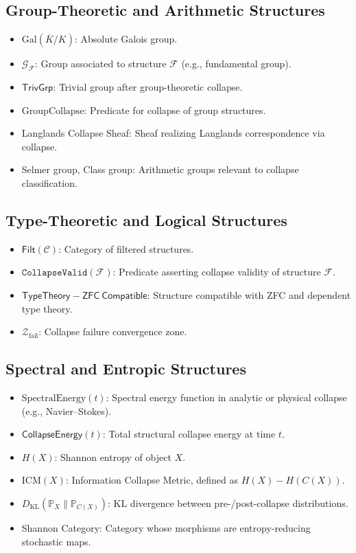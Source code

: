 \documentclass[11pt]{article}
\begin{document}
\subsection*{Group-Theoretic and Arithmetic Structures}

\begin{itemize}
  \item $\mathrm{Gal}(\overline{K}/K)$: Absolute Galois group.
  \item $\mathcal{G}_{\mathcal{F}}$: Group associated to structure $\mathcal{F}$ (e.g., fundamental group).
  \item $\mathsf{TrivGrp}$: Trivial group after group-theoretic collapse.
  \item $\mathrm{GroupCollapse}$: Predicate for collapse of group structures.
  \item Langlands Collapse Sheaf: Sheaf realizing Langlands correspondence via collapse.
  \item Selmer group, Class group: Arithmetic groups relevant to collapse classification.
\end{itemize}

\subsection*{Type-Theoretic and Logical Structures}

\begin{itemize}
  \item $\mathsf{Filt}(\mathcal{C})$: Category of filtered structures.
  \item $\texttt{CollapseValid}(\mathcal{F})$: Predicate asserting collapse validity of structure $\mathcal{F}$.
  \item $\mathsf{TypeTheory{-}ZFC\ Compatible}$: Structure compatible with ZFC and dependent type theory.
  \item $\mathcal{Z}_{\mathrm{fail}}$: Collapse failure convergence zone.
\end{itemize}

\subsection*{Spectral and Entropic Structures}

\begin{itemize}
  \item $\mathrm{SpectralEnergy}(t)$: Spectral energy function in analytic or physical collapse (e.g., Navier–Stokes).
  \item $\mathsf{CollapseEnergy}(t)$: Total structural collapse energy at time $t$.
  \item $H(X)$: Shannon entropy of object $X$.
  \item $\mathrm{ICM}(X)$: Information Collapse Metric, defined as $H(X) - H(C(X))$.
  \item $D_{\mathrm{KL}}(\mathbb{P}_X \| \mathbb{P}_{C(X)})$: KL divergence between pre-/post-collapse distributions.
  \item Shannon Category: Category whose morphisms are entropy-reducing stochastic maps.
\end{itemize}
\end{document}
